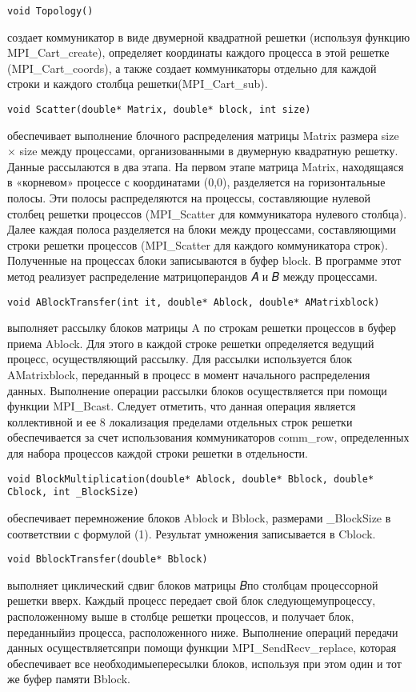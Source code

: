\documentclass{report}
\begin{document}
\begin{lstlisting}
void Topology()
\end{lstlisting}
создает коммуникатор в виде двумерной квадратной решетки
(используя функцию MPI_Cart_create), определяет координаты каждого процесса в этой решетке (MPI_Cart_coords), а также создает коммуникаторы отдельно для каждой строки и каждого столбца решетки(MPI_Cart_sub).
\begin{lstlisting}
void Scatter(double* Matrix, double* block, int size)
\end{lstlisting}
обеспечивает выполнение блочного распределения матрицы Matrix размера size × size между процессами, организованными в двумерную квадратную решетку. Данные рассылаются в два этапа. На первом этапе матрица Matrix, находящаяся в «корневом» процессе с координатами (0,0), разделяется на горизонтальные полосы. Эти полосы распределяются на процессы, составляющие нулевой столбец решетки процессов (MPI_Scatter для коммуникатора нулевого столбца). Далее каждая полоса разделяется на блоки между процессами, составляющими строки решетки процессов (MPI_Scatter для каждого коммуникатора строк). Полученные на процессах блоки записываются в буфер block. В программе этот метод реализует распределение матрицоперандов 𝐴 и 𝐵 между процессами.
\begin{lstlisting}
void ABlockTransfer(int it, double* Ablock, double* AMatrixblock) 
\end{lstlisting}
выполняет рассылку блоков матрицы A по строкам решетки процессов в буфер приема Ablock. Для этого в каждой строке решетки определяется ведущий процесс, осуществляющий рассылку. Для рассылки используется блок AMatrixblock, переданный в процесс в момент начального распределения данных. Выполнение операции рассылки блоков осуществляется при помощи функции MPI_Bcast. Следует отметить, что данная операция является коллективной и ее 8 локализация пределами отдельных строк решетки обеспечивается за счет использования
коммуникаторов comm_row, определенных для набора процессов каждой строки решетки в отдельности.
\begin{lstlisting}
void BlockMultiplication(double* Ablock, double* Bblock, double* Cblock, int _BlockSize)
\end{lstlisting}
обеспечивает перемножение блоков Ablock и Bblock, размерами _BlockSize в соответствии с формулой (1). Результат умножения записывается в Cblock.
\begin{lstlisting}
void BblockTransfer(double* Bblock) 
\end{lstlisting}
выполняет циклический сдвиг блоков матрицы 𝐵по столбцам процессорной решетки вверх. Каждый процесс передает свой блок следующемупроцессу, расположенному выше в столбце решетки процессов, и получает блок, переданныйиз процесса, расположенного ниже. Выполнение операций передачи данных осуществляетсяпри помощи функции MPI_SendRecv_replace, которая обеспечивает все необходимыепересылки блоков, используя при этом один и тот же буфер памяти Bblock.
\end{document}
